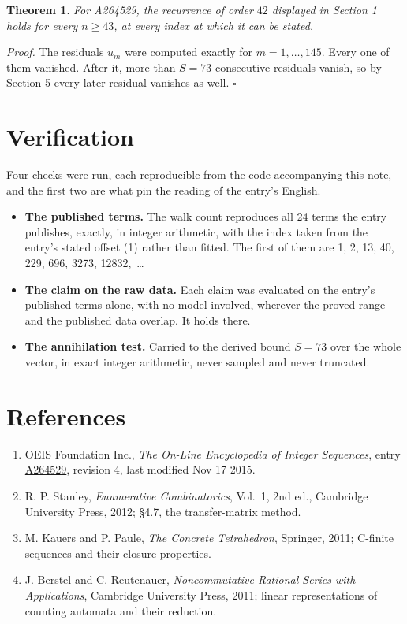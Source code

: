 \documentclass[11pt]{article}
\newtheorem{theorem}{Theorem}
\theoremstyle{definition}
\begin{document}
\begin{theorem} For A264529, the recurrence of order $42$ displayed in Section 1 holds for every $n \ge 43$, at every index at which it can be stated.\end{theorem}

{\itshape Proof.} The residuals $u_m$ were computed exactly for $m = 1,\dots,145$. Every one of them vanished. After it, more than $S = 73$ consecutive residuals vanish, so by Section 5 every later residual vanishes as well. $\square$

\section{Verification}

Four checks were run, each reproducible from the code accompanying this note, and the first two are what pin the reading of the entry's English.

\begin{itemize}

\item {\bfseries The published terms.} The walk count reproduces all 24 terms the entry publishes, exactly, in integer arithmetic, with the index taken from the entry's stated offset (1) rather than fitted. The first of them are 1, 2, 13, 40, 229, 696, 3273, 12832,~\dots

\item {\bfseries The claim on the raw data.} Each claim was evaluated on the entry's published terms alone, with no model involved, wherever the proved range and the published data overlap. It holds there.

\item {\bfseries The annihilation test.} Carried to the derived bound $S = 73$ over the whole vector, in exact integer arithmetic, never sampled and never truncated.

\end{itemize}

\section{References}

\begin{enumerate}

\item OEIS Foundation Inc., \emph{The On-Line Encyclopedia of Integer Sequences}, entry \href{https://oeis.org/A264529}{A264529}, revision 4, last modified Nov 17 2015.

\item R. P. Stanley, \emph{Enumerative Combinatorics}, Vol.~1, 2nd ed., Cambridge University Press, 2012; \S4.7, the transfer-matrix method.

\item M. Kauers and P. Paule, \emph{The Concrete Tetrahedron}, Springer, 2011; C-finite sequences and their closure properties.

\item J. Berstel and C. Reutenauer, \emph{Noncommutative Rational Series with Applications}, Cambridge University Press, 2011; linear representations of counting automata and their reduction.

\end{enumerate}
\end{document}
